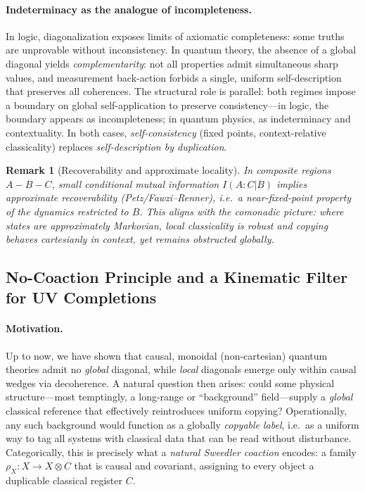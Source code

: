 \documentclass[11pt]{article}
\theoremstyle{upright}
\newtheorem{remark}{Remark}
\begin{document}
\paragraph{Indeterminacy as the analogue of incompleteness.}
In logic, diagonalization exposes limits of axiomatic completeness: some truths are unprovable without inconsistency. In quantum theory, the absence of a global diagonal yields \emph{complementarity}: not all properties admit simultaneous sharp values, and measurement back-action forbids a single, uniform self-description that preserves all coherences. The structural role is parallel: both regimes impose a boundary on global self-application to preserve consistency---in logic, the boundary appears as incompleteness; in quantum physics, as indeterminacy and contextuality. In both cases, \emph{self-consistency} (fixed points, context-relative classicality) replaces \emph{self-description by duplication}.

\begin{remark}[Recoverability and approximate locality]
In composite regions $A\!-\!B\!-\!C$, small conditional mutual information $I(A\!:\!C|B)$ implies approximate recoverability (Petz/Fawzi--Renner), i.e.\ a near-fixed-point property of the dynamics restricted to $B$. This aligns with the comonadic picture: where states are approximately Markovian, local classicality is robust and copying behaves cartesianly \emph{in context}, yet remains obstructed globally.
\end{remark}

\subsection{No-Coaction Principle and a Kinematic Filter for UV Completions}
\label{sec:no-coaction-uv-filter}

\paragraph{Motivation.}
Up to now, we have shown that causal, monoidal (non-cartesian) quantum theories admit no \emph{global} diagonal, while \emph{local} diagonals emerge only within causal wedges via decoherence. A natural question then arises: could some physical structure—most temptingly, a long-range or “background” field—supply a \emph{global} classical reference that effectively reintroduces uniform copying? Operationally, any such background would function as a globally \emph{copyable label}, i.e.\ as a uniform way to tag all systems with classical data that can be read without disturbance. Categorically, this is precisely what a \emph{natural Sweedler coaction} encodes: a family $\rho_X:X\!\to\!X\!\otimes\!C$ that is causal and covariant, assigning to every object a duplicable classical register $C$.
\end{document}
